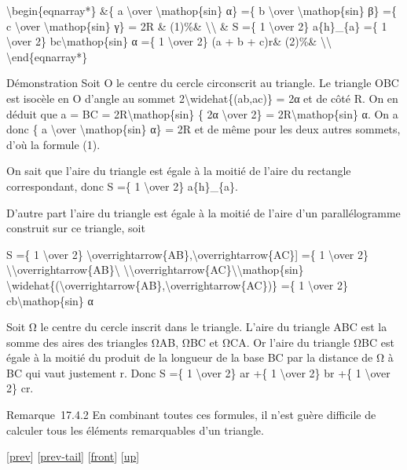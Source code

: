 \documentclass[]{article}
\begin{document}
\textbackslash{}begin\{eqnarray*\} \&\{ a \textbackslash{}over
\textbackslash{}mathop\{sin\} α\} =\{ b \textbackslash{}over
\textbackslash{}mathop\{sin\} β\} =\{ c \textbackslash{}over
\textbackslash{}mathop\{sin\} γ\} = 2R \& (1)\%\&
\textbackslash{}\textbackslash{} \& S =\{ 1 \textbackslash{}over 2\}
a\{h\}\_\{a\} =\{ 1 \textbackslash{}over 2\}
bc\textbackslash{}mathop\{sin\} α =\{ 1 \textbackslash{}over 2\} (a + b
+ c)r\& (2)\%\& \textbackslash{}\textbackslash{}
\textbackslash{}end\{eqnarray*\}

Démonstration Soit O le centre du cercle circonscrit au triangle. Le
triangle OBC est isocèle en O d'angle au sommet
2\textbackslash{}widehat\{(ab,ac)\} = 2α et de côté R. On en déduit que
a = BC = 2R\textbackslash{}mathop\{sin\} \{ 2α \textbackslash{}over 2\}
= 2R\textbackslash{}mathop\{sin\} α. On a donc \{ a \textbackslash{}over
\textbackslash{}mathop\{sin\} α\} = 2R et de même pour les deux autres
sommets, d'où la formule (1).

On sait que l'aire du triangle est égale à la moitié de l'aire du
rectangle correspondant, donc S =\{ 1 \textbackslash{}over 2\}
a\{h\}\_\{a\}.

D'autre part l'aire du triangle est égale à la moitié de l'aire d'un
parallélogramme construit sur ce triangle, soit

S =\{ 1 \textbackslash{}over 2\}
\textbar{}{[}\textbackslash{}overrightarrow\{AB\},\textbackslash{}overrightarrow\{AC\}{]}\textbar{}
=\{ 1 \textbackslash{}over 2\}
\textbackslash{}\textbar{}\textbackslash{}overrightarrow\{AB\}\textbackslash{}\textbar{}
\textbackslash{}\textbar{}\textbackslash{}overrightarrow\{AC\}\textbackslash{}\textbar{}\textbackslash{}mathop\{sin\}
\textbackslash{}widehat\{(\textbackslash{}overrightarrow\{AB\},\textbackslash{}overrightarrow\{AC\})\}
=\{ 1 \textbackslash{}over 2\} cb\textbackslash{}mathop\{sin\} α

Soit Ω le centre du cercle inscrit dans le triangle. L'aire du triangle
ABC est la somme des aires des triangles ΩAB, ΩBC et ΩCA. Or l'aire du
triangle ΩBC est égale à la moitié du produit de la longueur de la base
BC par la distance de Ω à BC qui vaut justement r. Donc S =\{ 1
\textbackslash{}over 2\} ar +\{ 1 \textbackslash{}over 2\} br +\{ 1
\textbackslash{}over 2\} cr.

Remarque~17.4.2 En combinant toutes ces formules, il n'est guère
difficile de calculer tous les éléments remarquables d'un triangle.

{[}\href{coursse94.html}{prev}{]}
{[}\href{coursse94.html\#tailcoursse94.html}{prev-tail}{]}
{[}\href{coursse95.html}{front}{]}
{[}\href{coursch18.html\#coursse95.html}{up}{]}
\end{document}
